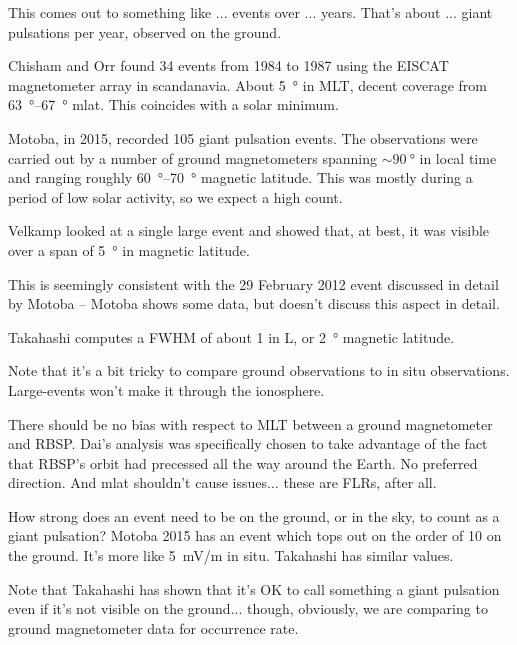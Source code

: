 This comes out to something like ... events over ... years. That's about ... giant pulsations per year, observed on the ground. 


Chisham and Orr\cite{chisham_1991} found 34 events from 1984 to 1987 using the EISCAT magnetometer array in scandanavia. About \SI{5}{\degree} in MLT, decent coverage from \SIrange{63}{67}{\degree} mlat. This coincides with a solar minimum. 

Motoba, in 2015, recorded 105 giant pulsation events. The observations were carried out by a number of ground magnetometers spanning $\sim \SI{90}{\degree}$ in local time and ranging roughly \SIrange{60}{70}{\degree} magnetic latitude\cite{motoba_2015}. This was mostly during a period of low solar activity, so we expect a high count. 


Velkamp\cite{veldkamp_1960} looked at a single large event and showed that, at best, it was visible over a span of \SI{5}{\degree} in magnetic latitude. 

This is seemingly consistent with the 29 February 2012 event discussed in detail by Motoba\cite{motoba_2015} -- Motoba shows some data, but doesn't discuss this aspect in detail. 

Takahashi\cite{takahashi_2011} computes a FWHM of about 1 in L, or \SI{2}{\degree} magnetic latitude. 


Note that it's a bit tricky to compare ground observations to in situ observations. Large-\azm events won't make it through the ionosphere. 

There should be no bias with respect to MLT between a ground magnetometer and RBSP. Dai's analysis was specifically chosen to take advantage of the fact that RBSP's orbit had precessed all the way around the Earth. No preferred direction. And mlat shouldn't cause issues... these are FLRs, after all. 

How strong does an event need to be on the ground, or in the sky, to count as a giant pulsation? Motoba 2015\cite{motoba_2015} has an event which tops out on the order of \SI{10}{\nT} on the ground. It's more like \SI{5}{\mV/\m} in situ. Takahashi\cite{takahashi_2011} has similar values. 

Note that Takahashi\cite{takahashi_2013} has shown that it's OK to call something a giant pulsation even if it's not visible on the ground... though, obviously, we are comparing to ground magnetometer data for occurrence rate. 

